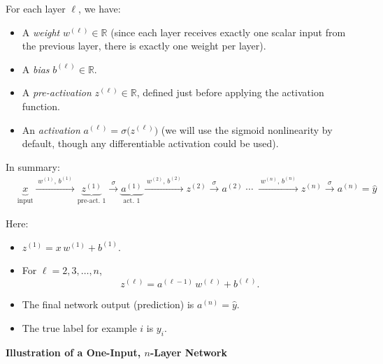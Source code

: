 \documentclass{article}
\begin{document}
\vspace{0.5em}
\noindent For each layer \(\ell\), we have:
\begin{itemize}
    \item A \emph{weight} \(w^{(\ell)}\in\mathbb{R}\) (since each layer receives exactly one scalar input from the previous layer, there is exactly one weight per layer).
    \item A \emph{bias} \(b^{(\ell)}\in\mathbb{R}\).
    \item A \emph{pre-activation} \(z^{(\ell)}\in\mathbb{R}\), defined just before applying the activation function.
    \item An \emph{activation} \(a^{(\ell)} = \sigma\bigl(z^{(\ell)}\bigr)\) (we will use the sigmoid nonlinearity by default, though any differentiable activation could be used).
\end{itemize}

\noindent In summary:
\[
    \begin{aligned}
        &\underbrace{x}_{\text{input}} 
        \xrightarrow{\;w^{(1)},\,b^{(1)}\;}
        \underbrace{z^{(1)}}_{\text{pre-act. 1}}
        \xrightarrow{\sigma}
        \underbrace{a^{(1)}}_{\text{act. 1}}
        \xrightarrow{\;w^{(2)},\,b^{(2)}\;}
        z^{(2)} \xrightarrow{\sigma} a^{(2)}
        \;\cdots\;
        \xrightarrow{\;w^{(n)},\,b^{(n)}\;}
        z^{(n)} \xrightarrow{\sigma} a^{(n)} = \hat{y}
    \end{aligned}
\]

\noindent Here:
\begin{itemize}
    \item \(z^{(1)} = x\,w^{(1)} + b^{(1)}\).  
    \item For \(\ell = 2,3,\dots,n\), 
    \[
      z^{(\ell)} = a^{(\ell-1)}\,w^{(\ell)} + b^{(\ell)}.
    \]
    \item The final network output (prediction) is \(a^{(n)} = \hat{y}\).  
    \item The true label for example \(i\) is \(y_i\).  
\end{itemize}

\vspace{1em}
\noindent \textbf{Illustration of a One-Input, \(n\)-Layer Network}
\end{document}
